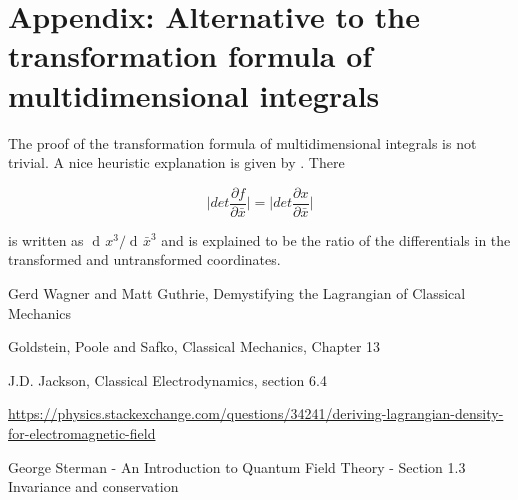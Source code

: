 \documentclass{article}
\DeclareMathOperator{\dd}{d\!}
\begin{document}
\section{Appendix: Alternative to the transformation formula of multidimensional integrals} \label{TranformationFormula}

The proof of the transformation formula of multidimensional integrals is not trivial. 
A nice heuristic explanation is given by \cite{Sterman}. There

\begin{equation}
\bigg|det \frac{\partial f}{\partial \bar{x}} \bigg| =  \bigg|det \frac{\partial x}{\partial \bar{x}} \bigg|
\end{equation}

is written as $\dd x^3 / \dd \bar{x}^3$ and is explained to be the ratio of the differentials in the transformed and untransformed coordinates.


\begin{thebibliography}{9}

 Gerd Wagner and Matt Guthrie, Demystifying the Lagrangian of Classical Mechanics

 Goldstein, Poole and Safko, Classical Mechanics, Chapter 13 

 J.D. Jackson, Classical Electrodynamics, section 6.4

 \url{https://physics.stackexchange.com/questions/34241/deriving-lagrangian-density-for-electromagnetic-field}

 George Sterman - An Introduction to Quantum Field Theory - Section 1.3 Invariance and conservation


\end{thebibliography}
\end{document}

